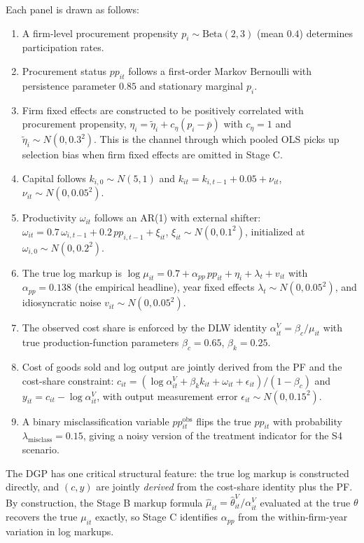 \documentclass[11pt]{article}
\begin{document}
Each panel is drawn as follows:

\begin{enumerate}
\item A firm-level procurement propensity $p_i \sim \mathrm{Beta}(2,3)$ (mean $0.4$) determines participation rates.
\item Procurement status $pp_{it}$ follows a first-order Markov Bernoulli with persistence parameter $0.85$ and stationary marginal $p_i$.
\item Firm fixed effects are constructed to be positively correlated with procurement propensity, $\eta_i = \tilde\eta_i + c_\eta(p_i - \bar{p})$ with $c_\eta = 1$ and $\tilde\eta_i \sim N(0, 0.3^2)$. This is the channel through which pooled OLS picks up selection bias when firm fixed effects are omitted in Stage C.
\item Capital follows $k_{i,0} \sim N(5, 1)$ and $k_{it} = k_{i,t-1} + 0.05 + \nu_{it}$, $\nu_{it} \sim N(0, 0.05^2)$.
\item Productivity $\omega_{it}$ follows an AR(1) with external shifter: $\omega_{it} = 0.7\, \omega_{i,t-1} + 0.2\, pp_{i,t-1} + \xi_{it}$, $\xi_{it} \sim N(0, 0.1^2)$, initialized at $\omega_{i,0} \sim N(0, 0.2^2)$.
\item The true log markup is $\log\mu_{it} = 0.7 + \alpha_{pp}\, pp_{it} + \eta_i + \lambda_t + v_{it}$ with $\alpha_{pp} = 0.138$ (the empirical headline), year fixed effects $\lambda_t \sim N(0, 0.05^2)$, and idiosyncratic noise $v_{it} \sim N(0, 0.05^2)$.
\item The observed cost share is enforced by the DLW identity $\alpha^V_{it} = \beta_c / \mu_{it}$ with true production-function parameters $\beta_c = 0.65$, $\beta_k = 0.25$.
\item Cost of goods sold and log output are jointly derived from the PF and the cost-share constraint: $c_{it} = (\log\alpha^V_{it} + \beta_k k_{it} + \omega_{it} + \epsilon_{it})/(1 - \beta_c)$ and $y_{it} = c_{it} - \log\alpha^V_{it}$, with output measurement error $\epsilon_{it} \sim N(0, 0.15^2)$.
\item A binary misclassification variable $pp^{\text{obs}}_{it}$ flips the true $pp_{it}$ with probability $\lambda_{\text{misclass}} = 0.15$, giving a noisy version of the treatment indicator for the S4 scenario.
\end{enumerate}

The DGP has one critical structural feature: the true log markup is constructed directly, and $(c, y)$ are jointly \emph{derived} from the cost-share identity plus the PF. By construction, the Stage B markup formula $\hat\mu_{it} = \hat\theta^V_{it} / \alpha^V_{it}$ evaluated at the true $\theta$ recovers the true $\mu_{it}$ exactly, so Stage C identifies $\alpha_{pp}$ from the within-firm-year variation in log markups.
\end{document}
